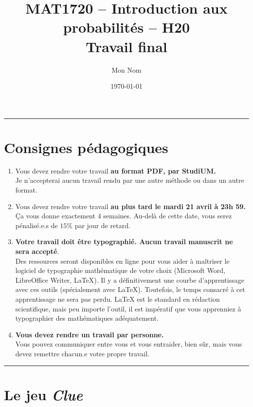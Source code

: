 \documentclass[11pt]{amsart}
\title  [Travail final]
        {
            MAT1720 -- Introduction aux probabilités -- H20 \\
            Travail final
        }
\author {
            Mon Nom
        }
\date{\today}
\theoremstyle{definition}
\theoremstyle{remark}
\numberwithin{equation}{section}
\newcommand \1 {\mathbbm 1}
\newcommand \lh {
	\setlength\parindent{0pt} 
	\rule{\textwidth}{0.5pt} 
	\setlength{\parindent}{11pt} 
}
\begin{document}
	\maketitle
	
	\lh
	\section*{Consignes pédagogiques}
	
	\begin{enumerate}[$\bullet$]
		\item Vous devez rendre votre travail \textbf{au format PDF, par StudiUM.} \\
		Je n'accepterai aucun travail rendu par une autre méthode ou dans un autre format.
		
		\item Vous devez rendre votre travail\textbf{ au plus tard le mardi 21 avril à 23h 59.} \\ 
		Ça vous donne exactement $4$ semaines. Au-delà de cette date, vous serez pénalisé.e.s de $15\%$ par jour de retard.
		
		\item \textbf{Votre travail doit être typographié. Aucun travail manuscrit ne sera accepté}. \\
		Des ressources seront disponibles en ligne pour vous aider à maîtriser le logiciel de typographie mathématique de votre choix (Microsoft Word, LibreOffice Writer, \LaTeX{}). Il y a définitivement une courbe d'apprentissage avec ces outils (spécialement avec \LaTeX{}). Toutefois, le temps consacré à cet apprentissage ne sera pas perdu. \LaTeX{} est le standard en rédaction scientifique, mais peu importe l'outil, il est impératif que vous apprenniez à typographier des mathématiques adéquatement.
		
		\item \textbf{Vous devez rendre un travail par personne.} \\
		Vous pouvez communiquer entre vous et vous entraider, bien sûr, mais vous devez remettre chacun.e votre propre travail.
	\end{enumerate}
	\lh
	\newpage
	
	\section{Le jeu \em Clue \em}
	
\end{document}
